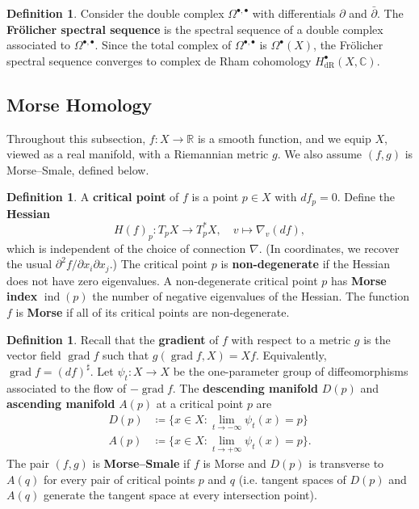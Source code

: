 \documentclass{report}
\theoremstyle{plain}
\theoremstyle{definition}
\newtheorem{definition}[theorem]{Definition}
\theoremstyle{remark}
\newcommand{\di}{\partial}
\newcommand{\bC}{\mathbb{C}}
\newcommand{\bR}{\mathbb{R}}
\DeclareMathOperator{\grad}{grad}
\DeclareMathOperator{\ind}{ind}
\newcommand{\dR}{\mathrm{dR}}
\newcommand{\bdi}{\bar{\di}}
\begin{document}
\begin{definition}
  Consider the double complex $\Omega^{\bullet,\bullet}$ with
  differentials $\di$ and $\bdi$. The {\bf Fr\"olicher spectral
    sequence} is the spectral sequence of a double complex associated
  to $\Omega^{\bullet,\bullet}$. Since the total complex of
  $\Omega^{\bullet,\bullet}$ is $\Omega^\bullet(X)$, the Fr\"olicher
  spectral sequence converges to complex de Rham cohomology
  $H^\bullet_{\dR}(X, \bC)$.
\end{definition}

\subsection{Morse Homology}

Throughout this subsection, $f\colon X \to \bR$ is a smooth function,
and we equip $X$, viewed as a real manifold, with a Riemannian metric
$g$. We also assume $(f, g)$ is Morse--Smale, defined below.

\begin{definition}
  A {\bf critical point} of $f$ is a point $p \in X$ with $df_p = 0$.
  Define the {\bf Hessian}
  \[ H(f)_p\colon T_pX \to T_p^*X, \quad v \mapsto \nabla_v(df), \]
  which is independent of the choice of connection $\nabla$. (In
  coordinates, we recover the usual $\di^2f/\di x_i \di x_j$.) The
  critical point $p$ is {\bf non-degenerate} if the Hessian does not
  have zero eigenvalues. A non-degenerate critical point $p$ has {\bf
    Morse index} $\ind(p)$ the number of negative eigenvalues of the
  Hessian. The function $f$ is {\bf Morse} if all of its critical
  points are non-degenerate.
\end{definition}

\begin{definition}
  Recall that the {\bf gradient} of $f$ with respect to a metric $g$
  is the vector field $\grad f$ such that $g(\grad f, X) = Xf$.
  Equivalently, $\grad f = (df)^\sharp$. Let $\psi_t\colon X \to X$ be
  the one-parameter group of diffeomorphisms associated to the flow of
  $-\grad f$. The {\bf descending manifold} $D(p)$ and {\bf ascending
    manifold} $A(p)$ at a critical point $p$ are
  \begin{align*}
    D(p) &\coloneqq \{x \in X : \lim_{t \to -\infty} \psi_t(x) = p\} \\
    A(p) &\coloneqq \{x \in X : \lim_{t \to +\infty} \psi_t(x) = p\}.
  \end{align*}
  The pair $(f, g)$ is {\bf Morse--Smale} if $f$ is Morse and $D(p)$
  is transverse to $A(q)$ for every pair of critical points $p$ and
  $q$ (i.e. tangent spaces of $D(p)$ and $A(q)$ generate the tangent
  space at every intersection point).
\end{definition}
\end{document}
